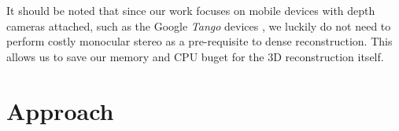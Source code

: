 \documentclass[conference,10pt]{IEEEtran}
\begin{document}
It should be noted that since our work focuses on mobile devices with depth
cameras attached, such as the Google \emph{Tango} devices \cite{Tango}, we
luckily do not need to perform costly monocular stereo as a pre-requisite to
dense reconstruction. This allows us to save our memory and CPU buget for the
3D reconstruction itself.

\section{Approach} 
\end{document}
